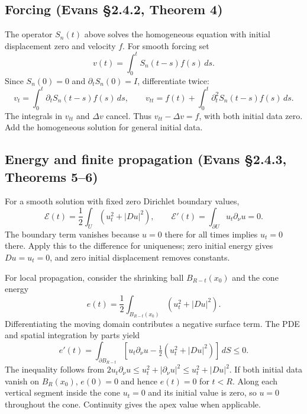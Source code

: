 \subsection{Forcing (Evans \S2.4.2, Theorem 4)}
The operator $S_n(t)$ above solves the homogeneous equation with
initial displacement zero and velocity $f$.
For smooth forcing set
\[
 v(t)=\int_0^t S_n(t-s)f(s)\,ds.
\]
Since $S_n(0)=0$ and $\partial_tS_n(0)=I$, differentiate twice:
\[
 v_t=\int_0^t\partial_tS_n(t-s)f(s)\,ds,\qquad
 v_{tt}=f(t)+\int_0^t\partial_t^2S_n(t-s)f(s)\,ds.
\]
The integrals in $v_{tt}$ and $\Delta v$ cancel.
Thus $v_{tt}-\Delta v=f$, with both initial data zero.
Add the homogeneous solution for general initial data.

\subsection{Energy and finite propagation (Evans \S2.4.3, Theorems 5--6)}
For a smooth solution with fixed zero Dirichlet boundary values,
\[
 \mathcal E(t)=\frac12\int_U(u_t^2+|Du|^2),\qquad
 \mathcal E'(t)=\int_{\partial U}u_t\partial_\nu u=0.
\]
The boundary term vanishes because $u=0$ there for all times implies
$u_t=0$ there. Apply this to the difference for uniqueness; zero initial
energy gives $Du=u_t=0$, and zero initial displacement removes constants.

For local propagation, consider the shrinking ball
$B_{R-t}(x_0)$ and the cone energy
\[
 e(t)=\frac12\int_{B_{R-t}(x_0)}(u_t^2+|Du|^2).
\]
Differentiating the moving domain contributes a negative surface term.
The PDE and spatial integration by parts yield
\[
 e'(t)=\int_{\partial B_{R-t}}
 \left[u_t\partial_\nu u-\tfrac12(u_t^2+|Du|^2)\right]\,dS\leq0.
\]
The inequality follows from
$2u_t\partial_\nu u\leq u_t^2+|\partial_\nu u|^2\leq u_t^2+|Du|^2$.
If both initial data vanish on $B_R(x_0)$, $e(0)=0$ and hence
$e(t)=0$ for $t<R$. Along each vertical segment inside the cone
$u_t=0$ and its initial value is zero, so $u=0$ throughout the cone.
Continuity gives the apex value when applicable.
\Needspace{45mm}
